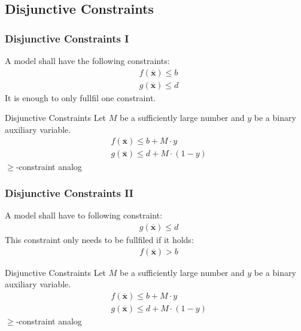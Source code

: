 \subsection{Disjunctive Constraints}
\begin{frame}
 \frametitle{Disjunctive Constraints I}
 A model shall have the following constraints:
 \begin{align*}
  &f(\mathbf{\overline{x}}) \leq b\\
  &g(\mathbf{\overline{x}}) \leq d
 \end{align*}
 It is enough to only fullfil one constraint.
 
 \begin{block}{Disjunctive Constraints}
 Let $M$ be a sufficiently large number and $y$ be a binary auxiliary variable.
 \begin{align*}
  &f(\mathbf{\overline{x}}) \leq b + M\cdot y\\
  &g(\mathbf{\overline{x}}) \leq d + M\cdot (1-y)
 \end{align*}
 \footnotesize $\geq$-constraint analog
 \end{block}
\end{frame}

\begin{frame}
 \frametitle{Disjunctive Constraints II}
 A model shall have to following constraint:
 \begin{align*}
  &g(\mathbf{\overline{x}}) \leq d
 \end{align*}
 This constraint only needs to be fullfiled if it holds:
 \begin{align*}
  &f(\mathbf{\overline{x}}) > b
 \end{align*}
 
 \begin{block}{Disjunctive Constraints}
 Let $M$ be a sufficiently large number and $y$ be a binary auxiliary variable.
 \begin{align*}
  &f(\mathbf{\overline{x}}) \leq b + M\cdot y\\
  &g(\mathbf{\overline{x}}) \leq d + M\cdot (1-y)
 \end{align*}
 \footnotesize $\geq$-constraint analog
 \end{block}
\end{frame}
